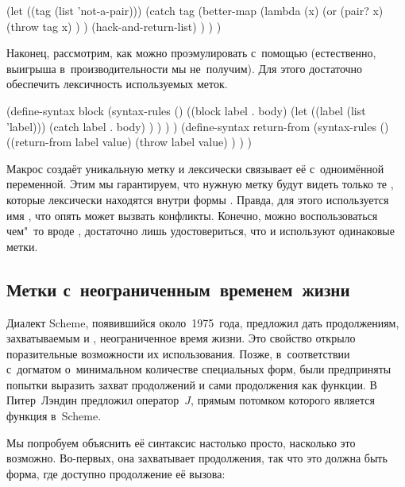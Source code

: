 \begin{code:lisp}
(let ((tag (list 'not-a-pair)))
  (catch tag
    (better-map (lambda (x)
                  (or (pair? x)
                      (throw tag x) ) )
                (hack-and-return-list) ) ) )
\end{code:lisp}

\bigskip

Наконец, рассмотрим, как можно проэмулировать  с~помощью 
(естественно, выигрыша в~производительности мы не~получим). Для этого достаточно
обеспечить лексичность используемых меток.

\begin{code:lisp}
(define-syntax block
  (syntax-rules ()
    ((block label . body)
     (let ((label (list 'label)))
       (catch label . body) ) ) ) )
(define-syntax return-from
  (syntax-rules ()
    ((return-from label value)
     (throw label value) ) ) )
\end{code:lisp}

Макрос  создаёт уникальную метку и лексически связывает её
с~одноимённой переменной. Этим мы гарантируем, что нужную метку будут видеть
только те , которые лексически находятся внутри формы
. Правда, для этого используется имя , что опять может
вызвать конфликты. Конечно, можно воспользоваться чем"~то вроде ,
достаточно лишь удостовериться, что  и  используют
одинаковые метки.


\subsection{Метки с~неограниченным~временем~жизни}%
\label{escape/forms/ssect:immortal}

Диалект Scheme, появившийся около~1975~года, предложил дать продолжениям,
захватываемым  и , неограниченное время жизни. Это свойство
открыло поразительные возможности их использования. Позже, в~соответствии
с~догматом о~минимальном количестве специальных форм, были предприняты попытки
выразить захват продолжений и сами продолжения как функции. В~\cite{lan65}
Питер~Лэндин предложил оператор~$J$\!, прямым потомком которого является
функция  в~Scheme.

Мы попробуем объяснить её синтаксис настолько просто, насколько это возможно.
Во-первых, она захватывает продолжения, так что это должна быть форма, где
доступно продолжение её вызова:

